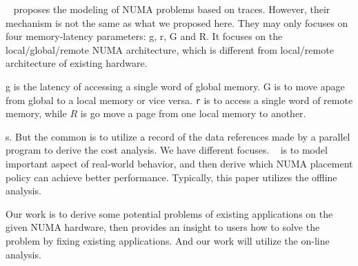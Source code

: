 ~\cite{Bolosky:1991:NPR:106972.106994} proposes the modeling of NUMA problems based on traces. 
However, their mechanism is not the same as what we proposed here. They may only focuses on four memory-latency parameters: g, r, G and R. It focuses on the local/global/remote NUMA architecture, which is different from local/remote architecture of existing hardware. 

g is the latency of accessing a single word of  global memory. G is to move apage from global to a local memory or vice versa. \texttt{r} is to access a single word of remote memory, while  $R$ is go move a page from one local memory to another. 

s. 
But the common is to utilize a record of the data references made by a parallel program to derive the cost analysis. 
We have different focuses. ~\cite{Bolosky:1991:NPR:106972.106994} is to model important aspect of real-world behavior, and then derive which NUMA placement policy can achieve better performance. Typically, this paper utilizes the offline analysis.   

Our work is to derive some potential problems of existing applications on the given NUMA hardware, then provides an insight to users how to solve the problem by fixing existing applications. And our work will utilize the on-line analysis. 




